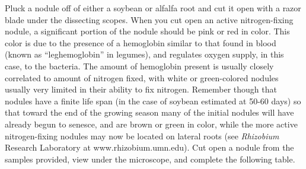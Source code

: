 \documentclass[
  letterpaper,
  twocolumn,
  portrait]{scrbook}
\begin{document}
Pluck a nodule off of either a soybean or alfalfa root and cut it open
with a razor blade under the dissecting scopes. When you cut open an
active nitrogen-fixing nodule, a significant portion of the nodule
should be pink or red in color. This color is due to the presence of a
hemoglobin similar to that found in blood (known as ``leghemoglobin'' in
legumes), and regulates oxygen supply, in this case, to the bacteria.
The amount of hemoglobin present is usually closely correlated to amount
of nitrogen fixed, with white or green-colored nodules usually very
limited in their ability to fix nitrogen. Remember though that nodules
have a finite life span (in the case of soybean estimated at 50-60 days)
so that toward the end of the growing season many of the initial nodules
will have already begun to senesce, and are brown or green in color,
while the more active nitrogen-fixing nodules may now be located on
lateral roots (see \emph{Rhizobium} Research Laboratory at
www.rhizobium.umn.edu). Cut open a nodule from the samples provided,
view under the microscope, and complete the following table.

 
  \providecommand{\huxb}[2]{\arrayrulecolor[RGB]{#1}\global\arrayrulewidth=#2pt}
  \providecommand{\huxvb}[2]{\color[RGB]{#1}\vrule width #2pt}
  \providecommand{\huxtpad}[1]{\rule{0pt}{#1}}
  \providecommand{\huxbpad}[1]{\rule[-#1]{0pt}{#1}}
\end{document}
